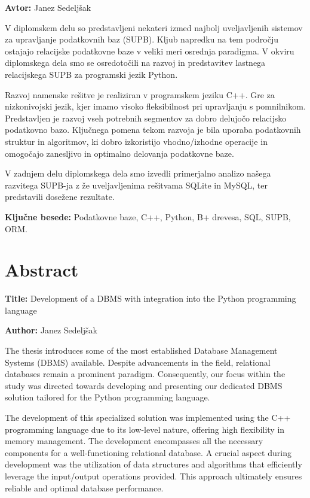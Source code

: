 \documentclass[a4paper,12pt,openright]{book}
\newcommand{\ttitleEn}{Development of a DBMS with integration into the Python programming language}
\newcommand{\tauthor}{Janez Sedeljšak}
\newcommand{\tkeywords}{Podatkovne baze, C++, Python, B+ drevesa, SQL, SUPB, ORM}
\newcommand{\clearemptydoublepage}{\newpage{\pagestyle{empty}\cleardoublepage}}
\begin{document}
\noindent\textbf{Avtor:} \tauthor
\bigskip

\noindent 
V diplomskem delu so predstavljeni nekateri izmed najbolj uveljavljenih sistemov za upravljanje podatkovnih baz (SUPB). Kljub napredku na tem področju ostajajo relacijske podatkovne baze v veliki meri osrednja paradigma. V okviru diplomskega dela smo se osredotočili na razvoj in predstavitev lastnega relacijskega SUPB za programski jezik Python.

Razvoj namenske rešitve je realiziran v programskem jeziku C++. Gre za nizkonivojski jezik, kjer imamo visoko fleksibilnost pri upravljanju s pomnilnikom. Predstavljen je razvoj vseh potrebnih segmentov za dobro delujočo relacijsko podatkovno bazo. Ključnega pomena tekom razvoja je bila uporaba podatkovnih struktur in algoritmov, ki dobro izkoristijo vhodno/izhodne operacije in omogočajo zanesljivo in optimalno delovanja podatkovne baze.

V zadnjem delu diplomskega dela smo izvedli primerjalno analizo našega razvitega SUPB-ja z že uveljavljenima rešitvama SQLite in MySQL, ter predstavili dosežene rezultate.
\bigskip

\noindent\textbf{Ključne besede:} \tkeywords.
\clearemptydoublepage

{}
\chapter*{Abstract}

\noindent\textbf{Title:} \ttitleEn
\bigskip

\noindent\textbf{Author:} \tauthor
\bigskip

\noindent The thesis introduces some of the most established Database Management Systems (DBMS) available. Despite advancements in the field, relational databases remain a prominent paradigm. Consequently, our focus within the study was directed towards developing and presenting our dedicated DBMS solution tailored for the Python programming language.

The development of this specialized solution was implemented using the C++ programming language due to its low-level nature, offering high flexibility in memory management. The development encompasses all the necessary components for a well-functioning relational database. A crucial aspect during development was the utilization of data structures and algorithms that efficiently leverage the input/output operations provided. This approach ultimately ensures reliable and optimal database performance.
\end{document}
